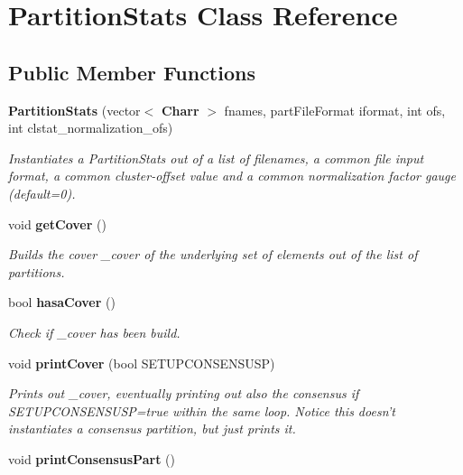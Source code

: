\section{Partition\-Stats Class Reference}
\label{classPartitionStats}
\subsection*{Public Member Functions}
\begin{CompactItemize}
\item 
{\bf Partition\-Stats} (vector$<$ {\bf Charr} $>$ fnames, part\-File\-Format iformat, int ofs, int clstat\_\-normalization\_\-ofs)\label{classPartitionStats_a1}

\begin{CompactList}\small\item\em Instantiates a Partition\-Stats out of a list of filenames, a common file input format, a common cluster-offset value and a common normalization factor gauge (default=0). \item\end{CompactList}\item 
void {\bf get\-Cover} ()\label{classPartitionStats_a2}

\begin{CompactList}\small\item\em Builds the cover \_\-cover of the underlying set of elements out of the list of partitions. \item\end{CompactList}\item 
bool {\bf hasa\-Cover} ()\label{classPartitionStats_a3}

\begin{CompactList}\small\item\em Check if \_\-cover has been build. \item\end{CompactList}\item 
void {\bf print\-Cover} (bool SETUPCONSENSUSP)
\begin{CompactList}\small\item\em Prints out \_\-cover, eventually printing out also the consensus if SETUPCONSENSUSP=true within the same loop. Notice this doesn't instantiates a consensus partition, but just prints it. \item\end{CompactList}\item 
void {\bf print\-Consensus\-Part} ()\label{classPartitionStats_a5}


\end{CompactItemize}
